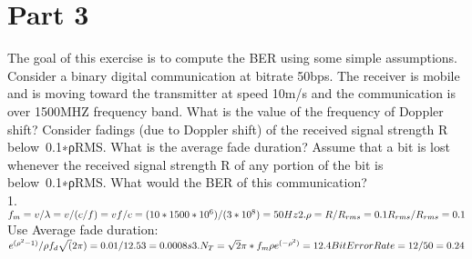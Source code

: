 \documentclass{article}
\begin{document}
	\section{Part 3} The goal of this exercise is to compute the BER using some simple assumptions. Consider a binary digital communication at bitrate 50bps. The receiver is mobile and is moving toward the transmitter at speed 10m/s and the communication is over 1500MHZ frequency band.
What is the value of the frequency of Doppler shift?
Consider fadings (due to Doppler shift) of the received signal strength R below 0.1∗ρRMS. What is the average fade duration?
Assume that a bit is lost whenever the received signal strength R of any portion of the bit is below 0.1∗ρRMS. What would the BER of this communication?
\\
1. $f_m = v/\lambda = v/(c/f) = vf/c = (10 * 1500*10^6)/(3*10^8)\\
 = 50Hz \\
2. \rho = R/R_{rms} = 0.1R_{rms}/R_{rms} = 0.1$ \\
Use Average fade duration: \\
$e^{(\rho ^2 - 1)}/\rho f_d\sqrt(2\pi) = 0.01/12.53 = 0.0008s \\
3.
N_T = \sqrt2\pi * f_m \rho e^{(- \rho ^2)} = 12.4 \\
Bit Error Rate = 12/50 = 0.24 $ \\
\end{document}
